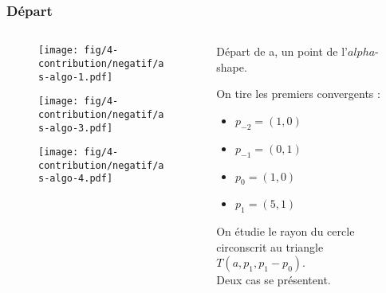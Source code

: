 \begin{frame}
  \frametitle{Départ}
	\begin{columns}[t]
 		\begin{column}{7cm}
      {
        \begin{figure}[h!]
          \centering
          \texttt{[image: fig/4-contribution/negatif/as-algo-1.pdf]}
      \end{figure}
      }
      {
        \begin{figure}[h!]
          \centering
          \texttt{[image: fig/4-contribution/negatif/as-algo-3.pdf]}
      \end{figure}
      }
      {
        \begin{figure}[h!]
          \centering
          \texttt{[image: fig/4-contribution/negatif/as-algo-4.pdf]}
      \end{figure}
      }
    \end{column}
    \begin{column}{3cm}
      \begin{block}{}
        {
					Départ de a, un point de l'$alpha$-shape.          
				}
        {
          On tire les premiers convergents :\\
          \begin{itemize}
            \item $p_{-2} = (1, 0)$
            \item $p_{-1} = (0, 1)$
            \item $p_{0} = (1, 0)$
            \item $p_{1} = (5, 1)$
          \end{itemize}            
        }

        {
          On étudie le rayon du cercle circonscrit au triangle $T(a, p_{1}, p_{1}-p_{0})$.\\
					\alert{Deux cas se présentent.}
        }
      \end{block}     
    \end{column}
  \end{columns}
\end{frame}


